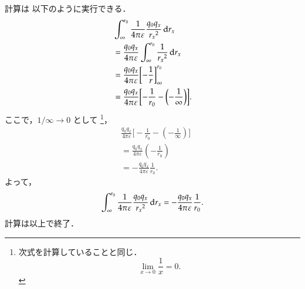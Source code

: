             計算は
            以下のように実行できる．
                \begin{align*}
                  &\int_{\infty}^{r_{0}}
                        \frac{1}{4 \pi \varepsilon}
                        \frac{q_{0}q_{x}}{{r_{x}}^{2}}
                    \,\mathrm{d} r_{x} \\
                  &=
                    \frac{q_{0}q_{x}}{4 \pi \varepsilon}
                    \int_{\infty}^{r_{0}}
                        \frac{1}{{r_{x}}^{2}}
                    \,\mathrm{d} r_{x} \\
                  &=
                    \frac{q_{0}q_{x}}{4 \pi \varepsilon}
                    \biggl[
                        -\frac{1}{r}
                    \biggr]_{\infty}^{r_{0}} \\
                  &=
                    \frac{q_{0}q_{x}}{4 \pi \varepsilon}
                    \biggl[
                        -\frac{1}{r_{0}} - \left( -\frac{1}{\infty} \right)
                    \biggr].
                \end{align*}
            ここで，$1/\infty \rightarrow 0$ として
                \footnote{
                    次式を計算していることと同じ．
                    \begin{equation*}
                        \lim_{x \rightarrow 0} \frac{1}{x} = 0.
                    \end{equation*}
                }，
                \begin{align*}
                   &\frac{q_{0}q_{x}}{4 \pi \varepsilon}
                    \biggl[
                        -\frac{1}{r_{0}} - \left( -\frac{1}{\infty} \right)
                    \biggr] \\
                  &=
                    \frac{q_{0}q_{x}}{4 \pi \varepsilon}
                    \left(
                         - \frac{1}{r_{0}}
                    \right) \\
                  &=
                    -\frac{q_{0}q_{x}}{4 \pi \varepsilon} \frac{1}{r_{0}}.
                \end{align*}
            よって，
                \begin{align*}
                    \int_{\infty}^{r_{0}}
                        \frac{1}{4 \pi \varepsilon}
                        \frac{q_{0}q_{x}}{{r_{x}}^{2}}
                    \,\mathrm{d} r_{x}
                  =
                    -\frac{q_{0}q_{x}}{4 \pi \varepsilon} \frac{1}{r_{0}}.
                \end{align*}
            計算は以上で終了．

